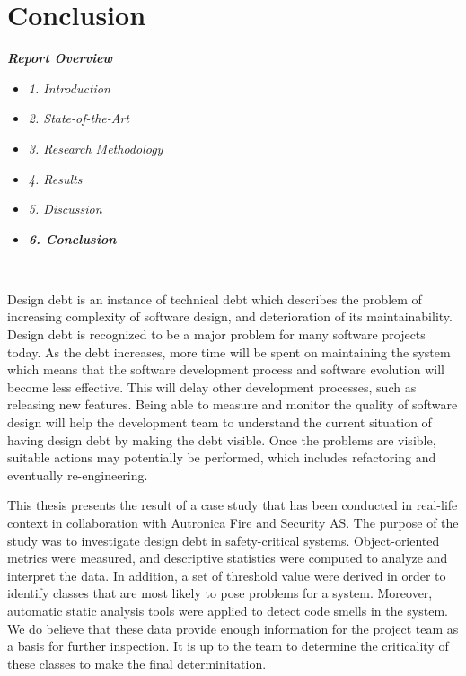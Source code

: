 
\chapter{Conclusion}
\label{chap:conclusion}

\textit{\textbf{Report Overview}}
\begin{itemize}
	\item \textit{1. Introduction}
	\item \textit{2. State-of-the-Art}
	\item \textit{3. Research Methodology}
	\item \textit{4. Results}
	\item \textit{5. Discussion}
	\item \textit{\textbf{6. Conclusion}}
\end{itemize} \

Design debt is an instance of technical debt which describes the problem of increasing complexity of software design, and deterioration of its maintainability. Design debt is recognized to be a major problem for many software projects today. As the debt increases, more time will be spent on maintaining the system which means that the software development process and software evolution will become less effective. This will delay other development processes, such as releasing new features. Being able to measure and monitor the quality of software design will help the development team to understand the current situation of having design debt by making the debt visible. Once the problems are visible, suitable actions may potentially be performed, which includes refactoring and eventually re-engineering. 


This thesis presents the result of a case study that has been conducted in real-life context in collaboration with Autronica Fire and Security AS. The purpose of the study was to investigate design debt in safety-critical systems. Object-oriented metrics were measured, and descriptive statistics were computed to analyze and interpret the data. In addition, a set of threshold value were derived in order to identify classes that are most likely to pose problems for a system. Moreover, automatic static analysis tools were applied to detect code smells in the system. We do believe that these data provide enough information for the project team as a basis for further inspection. It is up to the team to determine the criticality of these classes to make the final determinitation.

